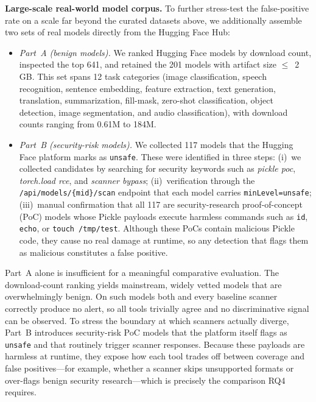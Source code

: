 \noindent \textbf{Large-scale real-world model corpus.}
To further stress-test the false-positive rate on a scale far beyond the curated datasets above, we additionally assemble two sets of real models directly from the Hugging Face Hub:
\begin{itemize}
    \item \emph{Part~A (benign models).} We ranked Hugging Face models by download count, inspected the top 641, and retained the 201 models with artifact size $\leq$~2\,GB. This set spans 12 task categories (image classification, speech recognition, sentence embedding, feature extraction, text generation, translation, summarization, fill-mask, zero-shot classification, object detection, image segmentation, and audio classification), with download counts ranging from 0.61M to 184M.
    \item \emph{Part~B (security-risk models).} We collected 117 models that the Hugging Face platform marks as \texttt{unsafe}. These were identified in three steps: (i)~we collected candidates by searching for security keywords such as \emph{pickle poc}, \emph{torch.load rce}, and \emph{scanner bypass}; (ii)~verification through the \texttt{/api/models/\{mid\}/scan} endpoint that each model carries \texttt{minLevel=unsafe}; (iii)~manual confirmation that all 117 are security-research proof-of-concept (PoC) models whose Pickle payloads execute harmless commands such as \texttt{id}, \texttt{echo}, or \texttt{touch /tmp/test}. Although these PoCs contain malicious Pickle code, they cause no real damage at runtime, so any detection that flags them as malicious constitutes a false positive.
\end{itemize}

Part~A alone is insufficient for a meaningful comparative evaluation. The download-count ranking yields mainstream, widely vetted models that are overwhelmingly benign. On such models both \toolname{} and every baseline scanner correctly produce no alert, so all tools trivially agree and no discriminative signal can be observed. To stress the boundary at which scanners actually diverge, Part~B introduces security-risk PoC models that the platform itself flags as \texttt{unsafe} and that routinely trigger scanner responses. Because these payloads are harmless at runtime, they expose how each tool trades off between coverage and false positives---for example, whether a scanner skips unsupported formats or over-flags benign security research---which is precisely the comparison RQ4 requires.

